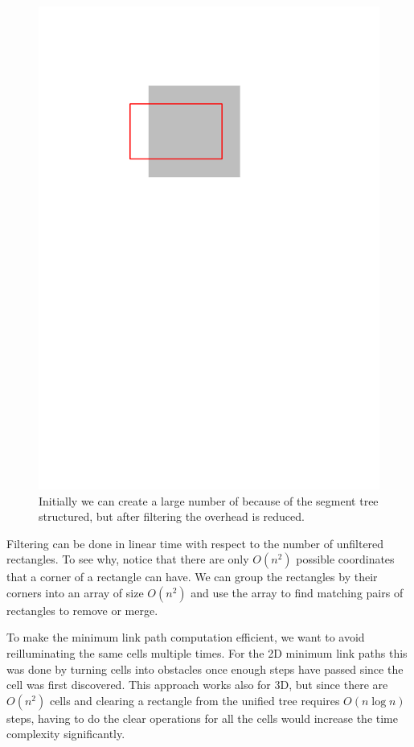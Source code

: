 \documentclass[english,gradu]{tktltiki2018}
\begin{document}
\begin{figure}
	\includegraphics[scale=0.5,page=2]{fig/filter}
	\caption{Initially we can create a large number of \addEs because of the segment tree structured, but after filtering the overhead is reduced.}\label{fig:filter}
\end{figure}

Filtering can be done in linear time with respect to the number of unfiltered rectangles.
To see why, notice that there are only $O(n^2)$ possible coordinates that a corner of a rectangle can have.
We can group the rectangles by their corners into an array of size $O(n^2)$ and use the array to find matching pairs of rectangles to remove or merge.

To make the minimum link path computation efficient, we want to avoid reilluminating the same cells multiple times.
For the 2D minimum link paths this was done by turning cells into obstacles once enough steps have passed since the cell was first discovered.
This approach works also for 3D, but since there are $O(n^2)$ cells and clearing a rectangle from the unified tree requires $O(n\log n)$ steps, having to do the clear operations for all the cells would increase the time complexity significantly.
\end{document}
